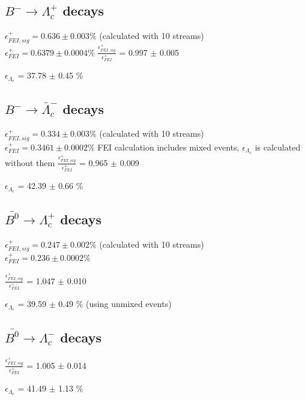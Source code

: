 \subsection{$B^- \rightarrow \Lambda_c^+$ decays}
$\epsilon^+_{FEI,sig} = 0.636 \pm 0.003\%$ (calculated with 10 streams)\\
$\epsilon^+_{FEI} = 0.6379 \pm 0.0004\%$
$\frac{\epsilon^+_{FEI,sig}}{\epsilon^+_{FEI}}$ = 0.997 $\pm $ 0.005%

$\epsilon_{\Lambda_c}$ = 37.78 $\pm $ 0.45 $\%$ %

\subsection{$B^- \rightarrow \bar{\Lambda}_c^-$ decays}
$\epsilon^+_{FEI,sig} = 0.334 \pm 0.003\%$ (calculated with 10 streams)\\
$\epsilon^+_{FEI} = 0.3461 \pm 0.0002\%$
FEI calculation includes mixed events, $\epsilon_{\Lambda_c}$ is calculated without them
$\frac{\epsilon^+_{FEI,sig}}{\epsilon^+_{FEI}}$ = 0.965 $\pm $ 0.009%

$\epsilon_{\Lambda_c}$ = 42.39 $\pm $ 0.66 $\%$ %


\subsection{$\bar{B^0} \rightarrow \Lambda_c^+$  decays}
$\epsilon^+_{FEI,sig} = 0.247 \pm 0.002\%$ (calculated with 10 streams)\\
$\epsilon^+_{FEI} = 0.236 \pm 0.0002\%$

$\frac{\epsilon^+_{FEI,sig}}{\epsilon^+_{FEI}}$ = 1.047 $\pm$ 0.010%

$\epsilon_{\Lambda_c}$ = 39.59 $\pm $ 0.49 $\%$ %
 (using unmixed events)

\subsection{$\bar{B^0} \rightarrow \Lambda_c^-$  decays}


$\frac{\epsilon^+_{FEI,sig}}{\epsilon^+_{FEI}}$ = 1.005 $\pm$ 0.014%

$\epsilon_{\Lambda_c}$ = 41.49  $\pm $ 1.13 $\%$ %